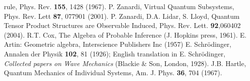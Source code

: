 \documentclass[aps,prl,amsmath,amssymb,twocolumn]{revtex4}
\theoremstyle{plain}
\theoremstyle{definition}
\theoremstyle{remark}
\begin{document}
\begin{references}
		rule, Phys. Rev. {\bf 155}, 1428 (1967).
		P. Zanardi, Virtual Quantum Subsystems, Phys. Rev.
		Lett {\bf 87}, 077901 (2001).
		 P. Zanardi, D.A. Lidar, S. Lloyd, Quantum
		Tensor Product Structures are Observable Induced, Phys. Rev. Lett.
		{\bf 92},060402 (2004).
		R.T. Cox, The Algebra of Probable Inference (J. Hopkins
		press, 1961).
		 E. Artin: Geometric algebra, Interscience Publishers Inc
		(1957)
		E. Schr\"odinger, Annalen der Physik {\bf 102}, 81
		(1926); English translation in E. Schr\"odinger, {\em Collected
			papers on Wave Mechanics} (Blackie \& Son, London, 1928).
		J.B. Hartle, Quantum Mechanics of Individual Systems,
		Am. J.  Phys. {\bf 36}, 704 (1967).
	\end{references}
	
	
\end{document}
